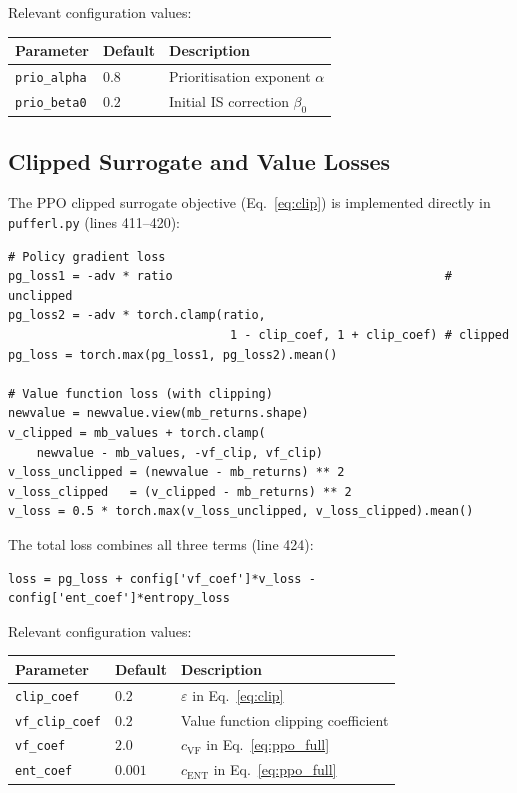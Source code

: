 \documentclass[12pt, a4paper]{article}
\theoremstyle{definition}
\theoremstyle{plain}
\theoremstyle{remark}
\begin{document}
Relevant configuration values:
\begin{center}
\begin{tabular}{lll}
  \toprule
  Parameter & Default & Description \\
  \midrule
  \texttt{prio\_alpha}  & $0.8$ & Prioritisation exponent $\alpha$ \\
  \texttt{prio\_beta0}  & $0.2$ & Initial IS correction $\beta_0$ \\
  \bottomrule
\end{tabular}
\end{center}

\subsection{Clipped Surrogate and Value Losses}
\label{sec:clip_impl}

The PPO clipped surrogate objective (Eq.~\ref{eq:clip}) is implemented directly
in \texttt{pufferl.py} (lines 411--420):

\begin{lstlisting}[style=pythonstyle,
  caption={PPO clipped policy and value losses (\texttt{pufferl.py}, lines 411--420).}]
# Policy gradient loss
pg_loss1 = -adv * ratio                                      # unclipped
pg_loss2 = -adv * torch.clamp(ratio,
                               1 - clip_coef, 1 + clip_coef) # clipped
pg_loss = torch.max(pg_loss1, pg_loss2).mean()

# Value function loss (with clipping)
newvalue = newvalue.view(mb_returns.shape)
v_clipped = mb_values + torch.clamp(
    newvalue - mb_values, -vf_clip, vf_clip)
v_loss_unclipped = (newvalue - mb_returns) ** 2
v_loss_clipped   = (v_clipped - mb_returns) ** 2
v_loss = 0.5 * torch.max(v_loss_unclipped, v_loss_clipped).mean()
\end{lstlisting}

The total loss combines all three terms (line 424):

\begin{lstlisting}[style=pythonstyle,
  caption={Combined PPO loss (\texttt{pufferl.py}, line 424).}]
loss = pg_loss + config['vf_coef']*v_loss - config['ent_coef']*entropy_loss
\end{lstlisting}

Relevant configuration values:
\begin{center}
\begin{tabular}{lll}
  \toprule
  Parameter & Default & Description \\
  \midrule
  \texttt{clip\_coef}    & $0.2$  & $\varepsilon$ in Eq.~\eqref{eq:clip} \\
  \texttt{vf\_clip\_coef}& $0.2$  & Value function clipping coefficient \\
  \texttt{vf\_coef}      & $2.0$  & $c_\mathrm{VF}$ in Eq.~\eqref{eq:ppo_full} \\
  \texttt{ent\_coef}     & $0.001$& $c_\mathrm{ENT}$ in Eq.~\eqref{eq:ppo_full} \\
  \bottomrule
\end{tabular}
\end{center}
\end{document}
